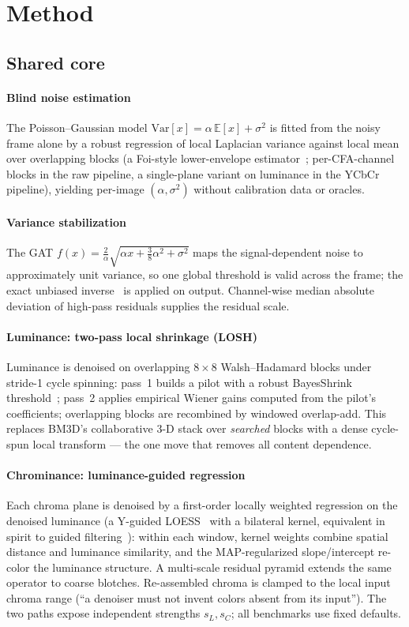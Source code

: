 \documentclass[journal]{IEEEtran}
\begin{document}
\section{Method}
\subsection{Shared core}
\paragraph{Blind noise estimation} The Poisson--Gaussian model
$\mathrm{Var}[x]=\alpha\,\mathbb{E}[x]+\sigma^2$ is fitted from the noisy
frame alone by a robust regression of local Laplacian variance against local
mean over overlapping blocks (a Foi-style lower-envelope
estimator~\cite{foi}; per-CFA-channel blocks in the raw pipeline, a
single-plane variant on luminance in the YCbCr pipeline), yielding
per-image $(\alpha,\sigma^2)$ without calibration data or oracles.

\paragraph{Variance stabilization} The GAT
$f(x)=\tfrac{2}{\alpha}\sqrt{\alpha x+\tfrac{3}{8}\alpha^2+\sigma^2}$ maps the
signal-dependent noise to approximately unit variance, so one global threshold
is valid across the frame; the exact unbiased inverse~\cite{makitalo} is
applied on output. Channel-wise median absolute deviation of high-pass
residuals supplies the residual scale.

\paragraph{Luminance: two-pass local shrinkage (LOSH)} Luminance is denoised
on overlapping $8{\times}8$ Walsh--Hadamard blocks under stride-1 cycle
spinning: pass~1 builds a pilot with a robust BayesShrink
threshold~\cite{bayesshrink}; pass~2 applies empirical Wiener gains computed
from the pilot's coefficients; overlapping blocks are recombined by windowed
overlap-add. This replaces BM3D's collaborative 3-D stack over
\emph{searched} blocks with a dense cycle-spun local transform --- the one
move that removes all content dependence.

\paragraph{Chrominance: luminance-guided regression} Each chroma plane is
denoised by a first-order locally weighted regression on the denoised
luminance (a Y-guided LOESS~\cite{loess} with a bilateral kernel, equivalent
in spirit to guided filtering~\cite{guidedfilter,kopf}): within each window,
kernel weights combine spatial distance and luminance similarity, and the
MAP-regularized slope/intercept re-color the luminance structure. A
multi-scale residual pyramid extends the same operator to coarse blotches.
Re-assembled chroma is clamped to the local input chroma range (``a denoiser
must not invent colors absent from its input''). The two paths expose
independent strengths $s_L,s_C$; all benchmarks use fixed defaults.
\end{document}
